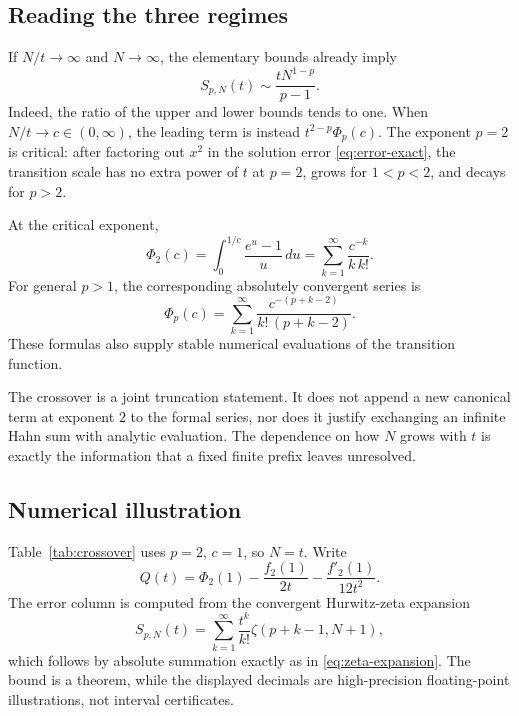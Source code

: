 \documentclass[11pt,a4paper]{article}
\numberwithin{equation}{section}
\theoremstyle{definition}
\theoremstyle{remark}
\begin{document}
\subsection{Reading the three regimes}
If $N/t\to\infty$ and $N\to\infty$, the elementary bounds already
imply
\begin{equation}\label{eq:large-N}
 S_{p,N}(t)\sim\frac{tN^{1-p}}{p-1}.
\end{equation}
Indeed, the ratio of the upper and lower bounds tends to one. When
$N/t\to c\in(0,\infty)$, the leading term is instead
$t^{2-p}\Phi_p(c)$. The exponent $p=2$ is critical: after factoring out
$x^2$ in the solution error \eqref{eq:error-exact}, the transition scale
has no extra power of $t$ at $p=2$, grows for $1<p<2$, and decays for
$p>2$.

At the critical exponent,
\begin{equation}\label{eq:Phi2}
 \Phi_2(c)=\int_0^{1/c}\frac{e^u-1}{u}\,du
          =\sum_{k=1}^{\infty}\frac{c^{-k}}{k\,k!}.
\end{equation}
For general $p>1$, the corresponding absolutely convergent series is
\begin{equation}\label{eq:Phi-series}
 \Phi_p(c)=\sum_{k=1}^{\infty}
   \frac{c^{-(p+k-2)}}{k!\,(p+k-2)}.
\end{equation}
These formulas also supply stable numerical evaluations of the transition
function.

The crossover is a joint truncation statement. It does not append a new
canonical term at exponent $2$ to the formal series, nor does it justify
exchanging an infinite Hahn sum with analytic evaluation. The dependence
on how $N$ grows with $t$ is exactly the information that a fixed finite
prefix leaves unresolved.

\subsection{Numerical illustration}
Table~\ref{tab:crossover} uses $p=2$, $c=1$, so $N=t$. Write
\[
 Q(t)=\Phi_2(1)-\frac{f_2(1)}{2t}-\frac{f'_2(1)}{12t^2}.
\]
The error column is computed from the convergent Hurwitz-zeta expansion
\begin{equation}\label{eq:hurwitz}
 S_{p,N}(t)=\sum_{k=1}^{\infty}
                  \frac{t^k}{k!}\zeta(p+k-1,N+1),
\end{equation}
which follows by absolute summation exactly as in
\eqref{eq:zeta-expansion}. The bound is a theorem, while the displayed
decimals are high-precision floating-point illustrations, not interval
certificates.
\end{document}
